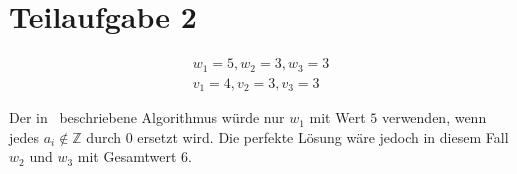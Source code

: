 \documentclass[a4paper]{article}
\begin{document}
    \section*{Teilaufgabe 2}
    \begin{gather*}
        w_1 = 5, w_2 = 3, w_3 = 3 \\
        v_1 = 4, v_2 = 3, v_3 = 3
    \end{gather*}

    Der in~ beschriebene Algorithmus würde nur $w_1$ mit Wert $5$ verwenden, wenn jedes $a_i \notin \mathbb{Z}$ durch $0$ ersetzt wird.
    Die perfekte Lösung wäre jedoch in diesem Fall $w_2$ und $w_3$ mit Gesamtwert $6$.
\end{document}
